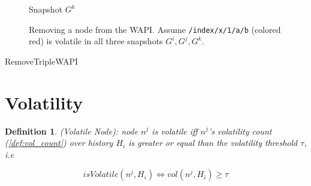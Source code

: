 \documentclass[abstracton,12pt]{scrreprt}
\newtheorem{definition}{Definition}
\begin{document}
\begin{figure}[h]
\begin{scriptsize}
\begin{multicols}{3}
\begin{center}
                Snapshot $G^k$
            \end{center}
        \end{multicols}
    \end{scriptsize}
    \caption{Removing a node from the WAPI. Assume \texttt{/index/x/1/a/b} (colored red) is volatile in all three snapshots $G^i, G^j, G^k$.}
    \label{fig:remove_wapi}
\end{figure}

\begin{algorithm}[H]
    \label{algo:remove_triple_wapi}
    \caption{RemoveTripleWAPI}
    \DontPrintSemicolon
    \begin{footnotesize}
    \end{footnotesize}
\end{algorithm}

\section{Volatility}
\label{sec:volatility}

\begin{definition}
    (Volatile Node): node $n^j$ is volatile iff $n^j$'s volatility count (\cref{def:vol_count}) over history $H_i$ is greater or equal than the volatility threshold $\tau$, i.e
    \begin{large}$$ isVolatile(n^j, H_i) \iff vol(n^j, H_i) \geq \tau $$\end{large}
\end{definition}
\end{document}
